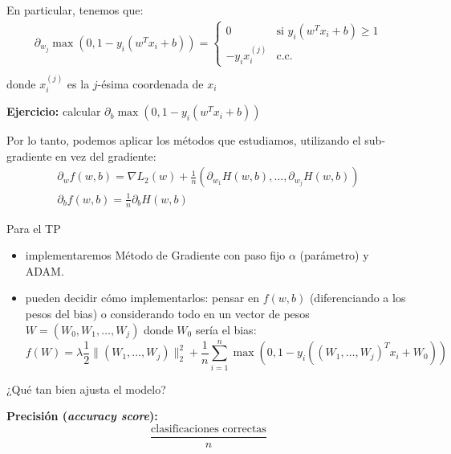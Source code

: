 \documentclass[10pt, aspectratio=169]{beamer}
\newcommand{\framet}[1]{\Large
#1
\vspace{1em} \\
\normalsize}
\begin{document}
    \begin{frame}
        En particular, tenemos que:
        \[
            \begin{array}{l}
                \partial_{w_j} \max(0, 1-y_i(w^Tx_i+b)) =
                \begin{cases}
                    0 & \text{si $y_i(w^Tx_i + b) \geq 1$} \\
                    -y_{i}x_i^{(j)} & \text{c.c.}
                \end{cases} \\[1em]
            \end{array}
        \]
        donde $x_i^{(j)}$ es la $j$-ésima coordenada de $x_i$

        \textbf{Ejercicio:} calcular $\partial_b \max(0, 1-y_i(w^Tx_i+b))$
        \vspace{1em}

        Por lo tanto, podemos aplicar los métodos que estudiamos, utilizando el sub-gradiente en vez del gradiente:
        \[
            \begin{array}{l}
                \partial_w f(w,b) = \nabla L_2(w) + \frac{1}{n}(\partial_{w_1}H(w,b),\dots, \partial_{w_j}H(w,b)) \\
                \partial_b f(w,b) = \frac{1}{n}\partial_{b}H(w,b)
            \end{array}
        \]
    \end{frame}

    \begin{frame}
        \framet{Para el TP}

        \begin{itemize}
            \item implementaremos Método de Gradiente con paso fijo $\alpha$ (parámetro) y ADAM.
            \item pueden decidir cómo implementarlos: pensar en $f(w,b)$ (diferenciando a los pesos del bias) o
            considerando todo en un vector de pesos $W=(W_0,W_1,\dots, W_j)$ donde $W_0$ sería el bias:
            \[f(W) = \lambda \frac{1}{2}\lVert (W_1,\dots, W_j)\rVert_2 ^2 + \frac{1}{n}\sum_{i=1}^n
            \max(0, 1-y_i((W_1,\dots, W_j)^Tx_i + W_0))\]
        \end{itemize}
    \end{frame}

    \begin{frame}
        \framet{¿Qué tan bien ajusta el modelo?}

        \textbf{Precisión (\textit{accuracy score}): }
        \[\dfrac{\text{clasificaciones correctas}}{n}\]
    \end{frame}
\end{document}
